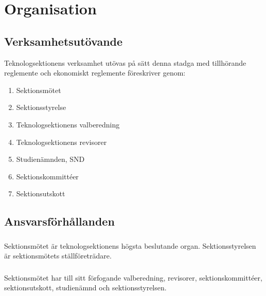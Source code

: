 \section{Organisation}

\subsection{Verksamhetsutövande}
Teknologsektionens verksamhet utövas på sätt denna stadga med
tillhörande reglemente och ekonomiskt reglemente föreskriver genom:

\begin{enumerate}
\item Sektionsmötet
\item Sektionsstyrelse
\item Teknologsektionens valberedning
\item Teknologsektionens revisorer
\item Studienämnden, SND
\item Sektionskommittéer
\item Sektionsutskott
\end{enumerate}

\subsection{Ansvarsförhållanden}
\subsubsection{}
Sektionsmötet är teknologsektionens högsta beslutande
organ. Sektionsstyrelsen är sektionsmötets ställföreträdare.

\subsubsection{}
Sektionsmötet har till sitt förfogande valberedning, revisorer,
sektionskommittéer, sektionsutskott, studienämnd och
sektionsstyrelsen.
